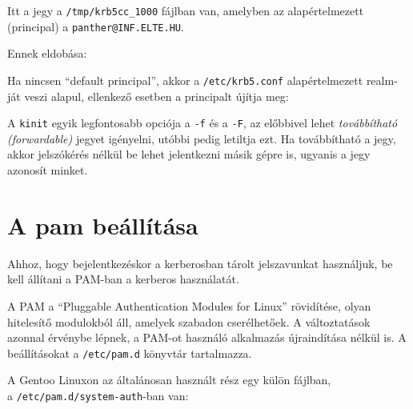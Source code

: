 Itt a jegy a \texttt{/tmp/krb5cc\_1000} fájlban van, amelyben az alapértelmezett (principal) a
\texttt{panther@INF.ELTE.HU}.

Ennek eldobása:


Ha nincsen ``default principal'', akkor a \texttt{/etc/krb5.conf} alapértelmezett realm-ját veszi alapul, ellenkező
esetben a principalt újítja meg:


A \texttt{kinit} egyik legfontosabb opciója a \texttt{-f} és a \texttt{-F}, az előbbivel lehet \emph{továbbítható
  (forwardable)} jegyet igényelni, utóbbi pedig letiltja ezt. Ha továbbítható a jegy, akkor jelszókérés nélkül be lehet
jelentkezni másik gépre is, ugyanis a jegy azonosít minket.


\section{A pam beállítása}
Ahhoz, hogy bejelentkezéskor a kerberosban tárolt jelszavunkat használjuk, be kell állítani a PAM-ban a kerberos
használatát.

A PAM a ``Pluggable Authentication Modules for Linux'' rövidítése, olyan hitelesítő modulokból áll, amelyek szabadon
cserélhetőek. A változtatások azonnal érvénybe lépnek, a PAM-ot használó alkalmazás újraindítása nélkül is. A
beállításokat a \texttt{/etc/pam.d} könyvtár tartalmazza.

A Gentoo Linuxon az általánosan használt rész egy külön fájlban,\\ a \texttt{/etc/pam.d/system-auth}-ban van:

